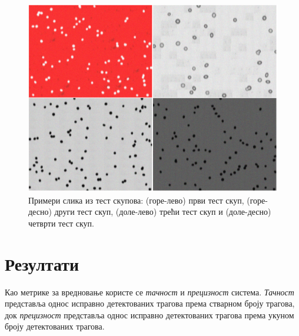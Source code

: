 \documentclass[11pt,a4paper,serbian,oneside]{book}
\begin{document}
\begin{figure}[h]
\begin{center}
\includegraphics[width=150mm]{images/test.png}
\end{center}
\caption{Примери слика из тест скупова: (горе-лево) први тест скуп, (горе-десно) други тест скуп, (доле-лево) трећи тест скуп и (доле-десно) четврти тест скуп.}
\label{fig:test}
\end{figure}

\section{Резултати}

Као метрике за вредновање користе се \textit{тачност} и \textit{прецизност} система. \textit{Тачност} пред\-став\-ља однос исправно детектованих трагова према стварном броју трагова, док \textit{прецизност} представља однос исправно детектованих трагова према укуном броју детектованих трагова.
\end{document}
